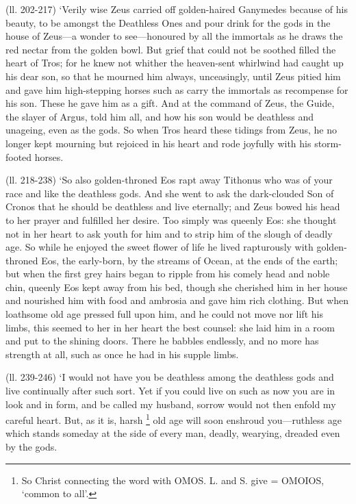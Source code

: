 (ll. 202-217) ‘Verily wise Zeus carried off golden-haired Ganymedes
because of his beauty, to be amongst the Deathless Ones and pour drink for the
gods in the house of Zeus—a wonder to see—honoured by all the
immortals as he draws the red nectar from the golden bowl. But grief that could
not be soothed filled the heart of Tros; for he knew not whither the
heaven-sent whirlwind had caught up his dear son, so that he mourned him
always, unceasingly, until Zeus pitied him and gave him high-stepping horses
such as carry the immortals as recompense for his son. These he gave him as a
gift. And at the command of Zeus, the Guide, the slayer of Argus, told him all,
and how his son would be deathless and unageing, even as the gods. So when Tros
heard these tidings from Zeus, he no longer kept mourning but rejoiced in his
heart and rode joyfully with his storm-footed horses.

(ll. 218-238) ‘So also golden-throned Eos rapt away Tithonus who was of
your race and like the deathless gods. And she went to ask the dark-clouded Son
of Cronos that he should be deathless and live eternally; and Zeus bowed his
head to her prayer and fulfilled her desire. Too simply was queenly Eos: she
thought not in her heart to ask youth for him and to strip him of the slough of
deadly age. So while he enjoyed the sweet flower of life he lived rapturously
with golden-throned Eos, the early-born, by the streams of Ocean, at the ends
of the earth; but when the first grey hairs began to ripple from his comely
head and noble chin, queenly Eos kept away from his bed, though she cherished
him in her house and nourished him with food and ambrosia and gave him rich
clothing. But when loathsome old age pressed full upon him, and he could not
move nor lift his limbs, this seemed to her in her heart the best counsel: she
laid him in a room and put to the shining doors. There he babbles endlessly,
and no more has strength at all, such as once he had in his supple limbs.

(ll. 239-246) ‘I would not have you be deathless among the deathless gods
and live continually after such sort. Yet if you could live on such as now you
are in look and in form, and be called my husband, sorrow would not then enfold
my careful heart. But, as it is, harsh \footnote{So Christ connecting the
word with OMOS. L. and S. give = OMOIOS, ‘common to all’.} old age
will soon enshroud you—ruthless age which stands someday at the side of
every man, deadly, wearying, dreaded even by the gods.

